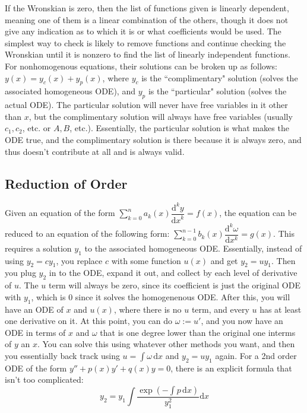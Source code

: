 \documentclass[12pt]{article}
\newcommand \dstyle \displaystyle
\renewcommand \d [1] {\mathrm{d}{#1}}
\newcommand \dx {{\d x}}
\newcommand \ndydx [1] {\dfrac{\mathrm{d}^{#1} y}{\dx^{#1}}}
\newcommand \ddfn [3] {\dfrac{\mathrm{d}^{#3}{#1}}{\d{#2}^{#3}}}
\begin{document}
If the Wronskian is zero, then the list of functions given is linearly dependent, meaning one of them is a linear combination of the others, though it does not give any indication as to which it is or what coefficients would be used. The simplest way to check is likely to remove functions and continue checking the Wronskian until it is nonzero to find the list of linearly independent functions. For nonhomogenous equations, their solutions can be broken up as follows: $y(x) = y_c(x) + y_p(x)$, where $y_c$ is the ``complimentary" solution (solves the associated homogeneous ODE), and $y_p$ is the ``particular" solution (solves the actual ODE). The particular solution will never have free variables in it other than $x$, but the complimentary solution will always have free variables (usually $c_1, c_2$, etc. or $A, B$, etc.). Essentially, the particular solution is what makes the ODE true, and the complimentary solution is there because it is always zero, and thus doesn't contribute at all and is always valid.

\subsection{Reduction of Order}

Given an equation of the form $\dstyle \sum_{k=0}^n a_k(x) \ndydx k = f(x)$, the equation can be reduced to an equation of the following form: $\dstyle \sum_{k=0}^{n-1} b_k(x) \ddfn \omega x k = g(x)$. This requires a solution $y_1$ to the associated homogeneous ODE. Essentially, instead of using $y_2 = c y_1$, you replace $c$ with some function $u(x)$ and get $y_2 = u y_1$. Then you plug $y_2$ in to the ODE, expand it out, and collect by each level of derivative of $u$. The $u$ term will always be zero, since its coefficient is just the original ODE with $y_1$, which is 0 since it solves the homogenenous ODE. After this, you will have an ODE of $x$ and $u(x)$, where there is no $u$ term, and every $u$ has at least one derivative on it. At this point, you can do $\omega := u'$, and you now have an ODE in terms of $x$ and $\omega$ that is one degree lower than the original one interms of $y$ an $x$. You can solve this using whatever other methods you want, and then you essentially back track using $u = \int \! \omega \, \dx$ and $y_2 = u y_1$ again. For a 2nd order ODE of the form $y'' + p(x) y' + q(x) y = 0$, there is an explicit formula that isn't too complicated:
\begin{equation}
	y_2 = y_1 \!\! \int \dfrac{\exp\!\left(- \! \int \! p \, \dx\right)}{y_1^2}\dx
\end{equation}
\end{document}
